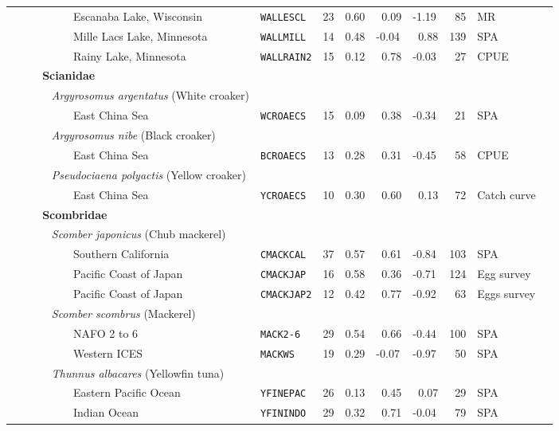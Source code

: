 \begin{flushleft}
\begin{tabular*}{7.1in}{llllllllll}
&~~~~~~~~~Escanaba Lake, Wisconsin&{\tt WALLESCL}&23&0.60&~0.09&-1.19&~85&MR  & \\ 
&~~~~~~~~~Mille Lacs Lake, Minnesota&{\tt WALLMILL}&14&0.48&-0.04&~0.88&139&SPA  & \\ 
&~~~~~~~~~Rainy Lake, Minnesota&{\tt WALLRAIN2}&15&0.12&~0.78&-0.03&~27&CPUE  & \\ 
&{\bf~~~Scianidae}&~&~&~&~&~&~&~  & \\ 
&{\it~~~~~Argyrosomus argentatus} (White croaker)&~&~&~&~&~&~&~  & \\ 
&~~~~~~~~~East China Sea&{\tt WCROAECS}&15&0.09&~0.38&-0.34&~21&SPA  & \\ 
&{\it~~~~~Argyrosomus nibe} (Black croaker)&~&~&~&~&~&~&~  & \\ 
&~~~~~~~~~East China Sea&{\tt BCROAECS}&13&0.28&~0.31&-0.45&~58&CPUE  & \\ 
&{\it~~~~~Pseudociaena polyactis} (Yellow croaker)&~&~&~&~&~&~&~  & \\ 
&~~~~~~~~~East China Sea&{\tt YCROAECS}&10&0.30&~0.60&~0.13&~72&Catch curve  & \\ 
&{\bf~~~Scombridae}&~&~&~&~&~&~&~  & \\ 
&{\it~~~~~Scomber japonicus} (Chub mackerel)&~&~&~&~&~&~&~  & \\ 
&~~~~~~~~~Southern California&{\tt CMACKCAL}&37&0.57&~0.61&-0.84&103&SPA  & \\ 
&~~~~~~~~~Pacific Coast of Japan&{\tt CMACKJAP}&16&0.58&~0.36&-0.71&124&Egg survey  & \\ 
&~~~~~~~~~Pacific Coast of Japan&{\tt CMACKJAP2}&12&0.42&~0.77&-0.92&~63&Eggs survey  & \\ 
&{\it~~~~~Scomber scombrus} (Mackerel)&~&~&~&~&~&~&~  & \\ 
&~~~~~~~~~NAFO 2 to 6&{\tt MACK2-6}&29&0.54&~0.66&-0.44&100&SPA  & \\ 
&~~~~~~~~~Western ICES&{\tt MACKWS}&19&0.29&-0.07&-0.97&~50&SPA  & \\ 
&{\it~~~~~Thunnus albacares} (Yellowfin tuna)&~&~&~&~&~&~&~  & \\ 
&~~~~~~~~~Eastern Pacific Ocean&{\tt YFINEPAC}&26&0.13&~0.45&~0.07&~29&SPA  & \\ 
&~~~~~~~~~Indian Ocean&{\tt YFININDO}&29&0.32&~0.71&-0.04&~79&SPA  & \\ 
\end{tabular*} 
\end{flushleft}
\newpage
